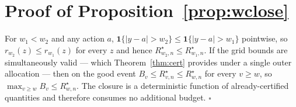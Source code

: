 \documentclass[11pt]{article}
\theoremstyle{definition}
\newcommand{\risk}{R^{\star}}
\newcommand{\ind}{\mathbf{1}}
\begin{document}
\section{Proof of Proposition~\ref{prop:wclose}}\label{app:wclose}

For $w_1<w_2$ and any action $a$, $\ind\{|y-a|>w_2\}\le\ind\{|y-a|>w_1\}$ pointwise, so $r_{w_2}(z)\le r_{w_1}(z)$ for every $z$ and hence $\risk_{w_2,n}\le\risk_{w_1,n}$. If the grid bounds are simultaneously valid --- which Theorem~\ref{thm:cert} provides under a single outer allocation --- then on the good event $B_v\le\risk_{v,n}\le\risk_{w,n}$ for every $v\ge w$, so $\max_{v\ge w}B_v\le\risk_{w,n}$. The closure is a deterministic function of already-certified quantities and therefore consumes no additional budget. \hfill$\square$
\end{document}
